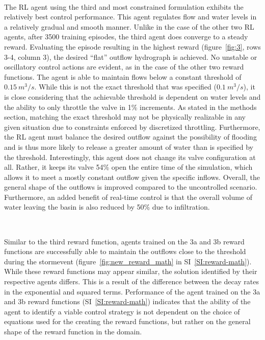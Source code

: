 \

The RL agent using the third and most constrained formulation exhibits the relatively best control performance.
This agent regulates flow and water levels in a relatively gradual and smooth manner.
Unlike in the case of the other two RL agents, after 3500 training episodes, the third agent does converge to a steady reward.
Evaluating the episode resulting in the highest reward (figure~\ref{fig:3}, rows 3-4, column 3), the desired “flat” outflow hydrograph is achieved.
No unstable or oscillatory control actions are evident, as in the case of the other two reward functions.
The agent is able to maintain flows below a constant threshold of $0.15\ m^3/s$.
While this is not the exact threshold that was specified ($0.1\ m^3/s$), it is close considering that the achievable threshold is dependent on water levels and the ability to only throttle the valve in 1\% increments.
As stated in the methods section, matching the exact threshold may not be physically realizable in any given situation due to constraints enforced by discretized throttling.
Furthermore, the RL agent must balance the desired outflow against the possibility of flooding and is thus more likely to release a greater amount of water than is specified by the threshold. Interestingly, this agent does not change its valve configuration at all.
Rather, it keeps its valve 54\% open the entire time of the simulation, which allows it to meet a mostly constant outflow given the specific inflows. Overall, the general shape of the outflows is improved compared to the uncontrolled scenario.
Furthermore, an added benefit of real-time control is that the overall volume of water leaving the basin is also reduced by 50\% due to infiltration.

\

Similar to the third reward function, agents trained on the 3a and 3b reward functions are successfully able to maintain the outflows close to the threshold during the stormevent (figure~\ref{fig:new_reward_math} in SI~\ref{SI:reward-math}).
While these reward functions may appear similar, the solution identified by their respective agents differs.
This is a result of the difference between the decay rates in the exponential and squared terms.
Performance of the agent trained on the 3a and 3b reward functions (SI~\ref{SI:reward-math}) indicates that the ability of the agent to identify a viable control strategy is not dependent on the choice of equations used for the creating the reward functions, but rather on the  general shape of the reward function in the domain.

